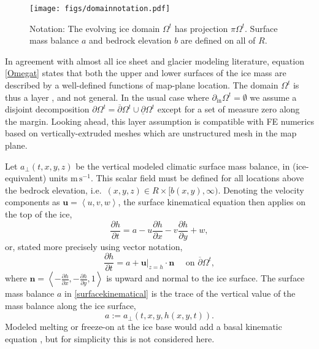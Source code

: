 \documentclass[letterpaper,final,12pt,reqno]{amsart}
\newcommand{\bn}{\mathbf{n}}
\newcommand{\bu}{\mathbf{u}}
\begin{document}
\begin{figure}[ht]
\begin{center}
\texttt{[image: figs/domainnotation.pdf]}
\end{center}
\caption{Notation: The evolving ice domain $\Omega^t$ has projection $\pi \Omega^t$.  Surface mass balance $a$ and bedrock elevation $b$ are defined on all of $R$.}
\label{fig:domainnotation}
\end{figure}

In agreement with almost all ice sheet and glacier modeling literature, equation \eqref{Omegat} states that both the upper and lower surfaces of the ice mass are described by a well-defined functions of map-plane location.  The domain $\Omega^t$ is thus a layer \cite{Bueler2020}, and not general.  In the usual case where $\partial_{\text{in}} \Omega^t=\emptyset$ we assume a disjoint decomposition $\partial \Omega^t = \overline{\partial} \Omega^t \cup \underline{\partial} \Omega^t$ except for a set of measure zero along the margin.  Looking ahead, this layer assumption is compatible with FE numerics based on vertically-extruded meshes which are unstructured mesh in the map plane.

Let $a_\perp(t,x,y,z)$ be the vertical modeled climatic surface mass balance, in (ice-equivalent) units $\text{m}\,\text{s}^{-1}$.  This scalar field must be defined for all locations above the bedrock elevation, i.e.~$(x,y,z) \in R\times[b(x,y),\infty)$.  Denoting the velocity components as $\bu=\left<u,v,w\right>$, the surface kinematical equation \cite{GreveBlatter2009} then applies on the top of the ice,
    $$\frac{\partial h}{\partial t} = a - u \frac{\partial h}{\partial x} - v \frac{\partial h}{\partial y} + w,$$
or, stated more precisely using vector notation,
\begin{equation}
\frac{\partial h}{\partial t} = a + \bu|_{z=h} \cdot \bn \quad \text{ on } \overline{\partial}\Omega^t, \label{surfacekinematical}
\end{equation}
where $\bn = \left<-\frac{\partial h}{\partial x},-\frac{\partial h}{\partial y},1\right>$ is upward and normal to the ice surface.  The surface mass balance $a$ in \eqref{surfacekinematical} is the trace \cite{Evans2010} of the vertical value of the mass balance along the ice surface,
    $$a := a_{\perp}(t,x,y,h(x,y,t)).$$
Modeled melting or freeze-on at the ice base would add a basal kinematic equation \cite[for example]{Aschwandenetal2012}, but for simplicity this is not considered here.
\end{document}
